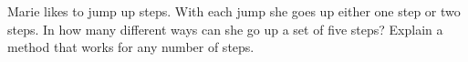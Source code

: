 Marie likes to jump up steps. With each jump she goes up either one step or two steps. In how many different ways can she go up a set of five steps? Explain a method that works for any number of steps.
